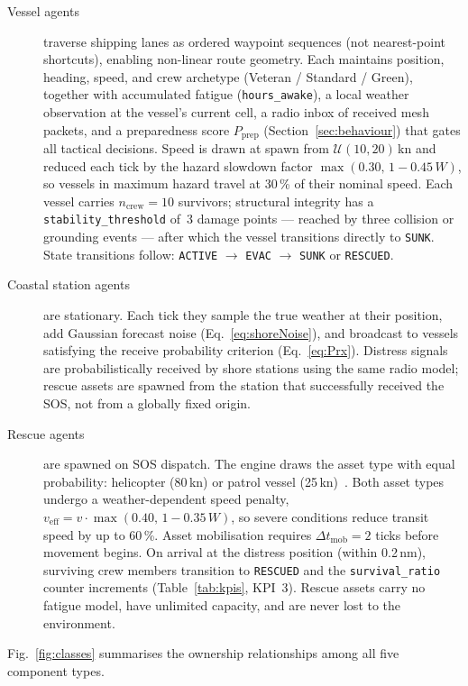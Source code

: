 \documentclass[cameraready]{Interspeech}
\begin{document}
\begin{description}
    \item[Vessel agents] traverse shipping lanes as ordered waypoint sequences (not nearest-point shortcuts), enabling non-linear route geometry. Each maintains position, heading, speed, and crew archetype (Veteran / Standard / Green), together with accumulated fatigue (\texttt{hours\_awake}), a local weather observation at the vessel's current cell, a radio inbox of received mesh packets, and a preparedness score $P_\text{prep}$ (Section~\ref{sec:behaviour}) that gates all tactical decisions. Speed is drawn at spawn from $\mathcal{U}(10, 20)$\,kn and reduced each tick by the hazard slowdown factor $\max(0.30,\,1 - 0.45\,W)$, so vessels in maximum hazard travel at 30\,\% of their nominal speed. Each vessel carries $n_\text{crew} = 10$ survivors; structural integrity has a \texttt{stability\_threshold} of~3 damage points — reached by three collision or grounding events — after which the vessel transitions directly to \texttt{SUNK}. State transitions follow: \texttt{ACTIVE} $\to$ \texttt{EVAC} $\to$ \texttt{SUNK} or \texttt{RESCUED}.

    \item[Coastal station agents] are stationary. Each tick they sample the true weather at their position, add Gaussian forecast noise (Eq.~\ref{eq:shoreNoise}), and broadcast to vessels satisfying the receive probability criterion (Eq.~\ref{eq:Prx}). Distress signals are probabilistically received by shore stations using the same radio model; rescue assets are spawned from the station that successfully received the SOS, not from a globally fixed origin.

    \item[Rescue agents] are spawned on SOS dispatch. The engine draws the asset type with equal probability: helicopter (80\,kn) or patrol vessel (25\,kn)~\cite{imosar2018}. Both asset types undergo a weather-dependent speed penalty, $v_\text{eff} = v \cdot \max(0.40,\,1 - 0.35\,W)$, so severe conditions reduce transit speed by up to 60\,\%. Asset mobilisation requires $\Delta t_\text{mob} = 2$ ticks before movement begins. On arrival at the distress position (within 0.2\,nm), surviving crew members transition to \texttt{RESCUED} and the \texttt{survival\_ratio} counter increments (Table~\ref{tab:kpis}, KPI~3). Rescue assets carry no fatigue model, have unlimited capacity, and are never lost to the environment.
\end{description}

Fig.~\ref{fig:classes} summarises the ownership relationships among all five component types.
\end{document}
